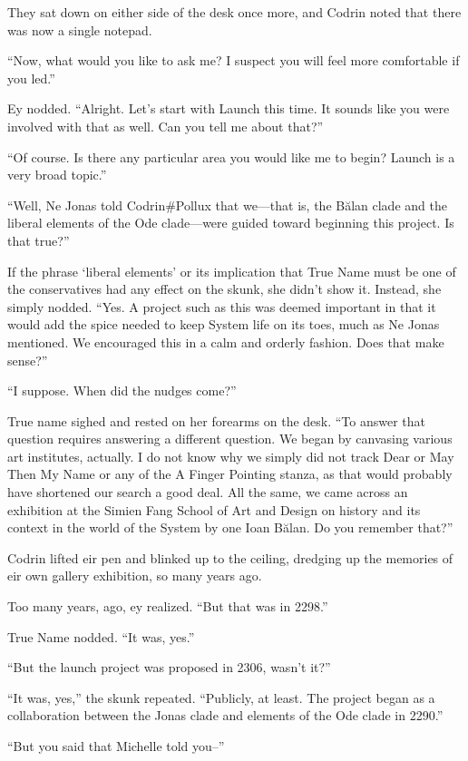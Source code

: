 They sat down on either side of the desk once more, and Codrin noted that there was now a single notepad.

``Now, what would you like to ask me? I suspect you will feel more comfortable if you led.''

Ey nodded. ``Alright. Let's start with Launch this time. It sounds like you were involved with that as well. Can you tell me about that?''

``Of course. Is there any particular area you would like me to begin? Launch is a very broad topic.''

``Well, Ne Jonas told Codrin\#Pollux that we---that is, the Bălan clade and the liberal elements of the Ode clade---were guided toward beginning this project. Is that true?''

If the phrase `liberal elements' or its implication that True Name must be one of the conservatives had any effect on the skunk, she didn't show it. Instead, she simply nodded. ``Yes. A project such as this was deemed important in that it would add the spice needed to keep System life on its toes, much as Ne Jonas mentioned. We encouraged this in a calm and orderly fashion. Does that make sense?''

``I suppose. When did the nudges come?''

True name sighed and rested on her forearms on the desk. ``To answer that question requires answering a different question. We began by canvasing various art institutes, actually. I do not know why we simply did not track Dear or May Then My Name or any of the A Finger Pointing stanza, as that would probably have shortened our search a good deal. All the same, we came across an exhibition at the Simien Fang School of Art and Design on history and its context in the world of the System by one Ioan Bălan. Do you remember that?''

Codrin lifted eir pen and blinked up to the ceiling, dredging up the memories of eir own gallery exhibition, so many years ago.

Too many years, ago, ey realized. ``But that was in 2298.''

True Name nodded. ``It was, yes.''

``But the launch project was proposed in 2306, wasn't it?''

``It was, yes,'' the skunk repeated. ``Publicly, at least. The project began as a collaboration between the Jonas clade and elements of the Ode clade in 2290.''

``But you said that Michelle told you--''

